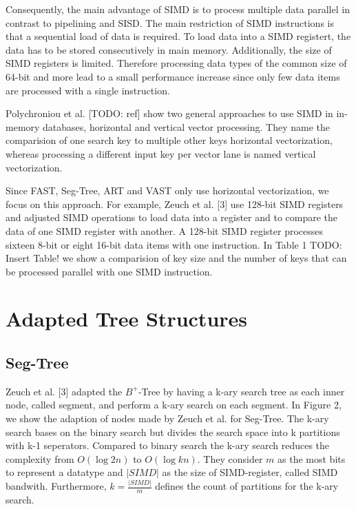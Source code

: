\documentclass[conference]{IEEEtran}
\begin{document}
Consequently, the main advantage of SIMD is to process multiple data parallel in contrast to pipelining and SISD. The main restriction of SIMD instructions is that a sequential load of data is required. To load data into a SIMD registert, the data has to be stored consecutively in main memory. Additionally, the size of SIMD registers is limited. Therefore processing data types of the common size of 64-bit and more lead to a small performance increase since only few data items are processed with a single instruction.

Polychroniou et al. [TODO: ref] show two general approaches to use SIMD in in-memory databases, horizontal and vertical vector processing. They name the comparision of one search key to multiple other keys horizontal vectorization, whereas processing a different input key per vector lane is named vertical vectorization.

Since FAST, Seg-Tree, ART and VAST only use horizontal vectorization, we focus on this approach.  For example, Zeuch et al. [3] use 128-bit SIMD registers and adjusted SIMD operations to load data into a register and to compare the data of one SIMD register with another. A 128-bit SIMD register processes sixteen 8-bit or eight 16-bit data items with one instruction. In Table 1 TODO: Insert Table! we show a comparision of key size and the number of keys that can be processed parallel with one SIMD instruction.


\section{Adapted Tree Structures}
\subsection{Seg-Tree}\label{SCM}
Zeuch et al. [3] adapted the $B^+$-Tree by having a k-ary search tree as each inner node, called segment, and perform a k-ary search on each segment.  In Figure 2, we show the adaption of nodes made by Zeuch et al. for Seg-Tree. The k-ary search bases on the binary search but divides the search space into k partitions with k-1 seperators. Compared to binary search the k-ary search reduces the complexity from $O(\log{2}{n})$ to $O(\log{k}{n})$. They consider $m$ as the most bits to represent a datatype and $\vert SIMD \vert$ as the size of SIMD-register, called SIMD bandwith. Furthermore, $k = \frac{\vert SIMD \vert }{m}$ defines the count of partitions for the k-ary search. 
\end{document}
